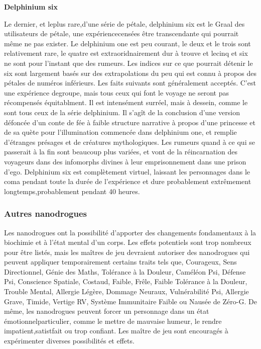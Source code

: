 \textbf{Delphinium six} 

Le dernier, et leplus rare,d'une série de pétale, delphinium six est le Graal des utilisateurs de pétale, une expériencecensées être transcendante qui pourrait même ne pas exister. Le delphinium one est peu courant, le deux et le trois sont relativement rare, le quatre est extraoridnairement dur à trouve et lecinq et six ne sont pour l'instant que des rumeurs. Les indices sur ce que pourrait détenir le six sont largement basés sur des extrapolations du peu qui est connu à propos des pétales de numéros inférieurs. Les faits suivants sont généralement acceptés. C'est une expérience degroupe, mais tous ceux  qui font le voyage ne seront pas récompensés équitablment. Il est intensément surréel, mais à dessein, comme le sont tous ceux de la série delphinium. Il s'agît de la conclusion d'une version défoncée d'un conte de fée à faible structure narrative à propos d'une princesse et de sa quète pour l'illumination commencée dans delphinium one, et remplie d'étranges présages et de créatures mythologiques. Les rumeurs quand à ce qui se passerait à la fin sont beaucoup plus variées, et vont de la réincarnation des voyageurs dans des infomorphs divines à leur emprisonnement dans une prison d'ego. Delphinium six est complètement virtuel, laissant les personnages dans le coma pendant toute la durée de l'expérience et dure probablement extrêmement longtemps,probablement pendant 40 heures. 

\subsubsection{Autres nanodrogues} 

Les nanodrogues ont la possibilité d'apporter des changements fondamentaux à la biochimie et à l'état mental d'un corps. Les effets potentiels sont trop nombreux pour être listés, mais les maîtres de jeu devraient autoriser des nanodrogues qui peuvent appliquer temporairement certains traits tels que, Courageux, Sens Directionnel, Génie des Maths, Tolérance à la Douleur, Caméléon Psi, Défense Psi, Conscience Spatiale, Costaud, Faible, Frêle, Faible Tolérance à la Douleur, Trouble Mental, Allergie Légère, Dommage Neuraux, Vulnérabilité Psi, Allergie Grave, Timide, Vertige RV, Système Immunitaire Faible ou Nausée de Zéro-G. De même, les nanodrogues peuvent forcer un personnage dans un état émotionnelparticulier, comme le mettre de mauvaise humeur, le rendre impatient,satistfait ou trop confiant. Les maître de jeu sont encouragés à expérimenter diverses possibilités et effets. 

